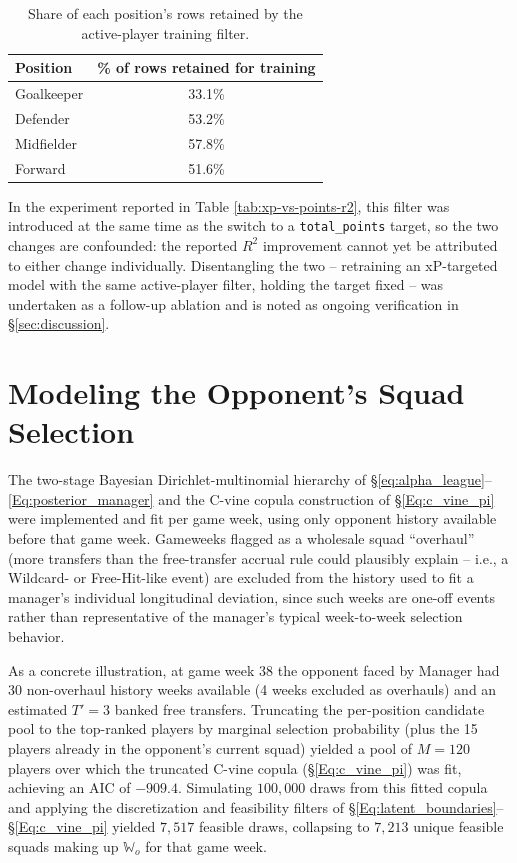 				\begin{table}[H]
					\begin{center}
						\begin{tabular}{|l|c|}
							\hline
							Position & \% of rows retained for training \\
							\hline
							Goalkeeper & 33.1\% \\
							\hline
							Defender & 53.2\% \\
							\hline
							Midfielder & 57.8\% \\
							\hline
							Forward & 51.6\% \\
							\hline
						\end{tabular}
					\end{center}
					\caption{Share of each position's rows retained by the active-player training filter.}
					\label{tab:active-filter}
				\end{table}

				In the experiment reported in Table \ref{tab:xp-vs-points-r2}, this filter was introduced at the same time as the switch to a \texttt{total\_points} target, so the two changes are confounded: the reported $R^2$ improvement cannot yet be attributed to either change individually. Disentangling the two -- retraining an xP-targeted model with the same active-player filter, holding the target fixed -- was undertaken as a follow-up ablation and is noted as ongoing verification in \S\ref{sec:discussion}.

		\section{Modeling the Opponent's Squad Selection} \label{sec:results-opponent}
			The two-stage Bayesian Dirichlet-multinomial hierarchy of \S\ref{eq:alpha_league}--\ref{Eq:posterior_manager} and the C-vine copula construction of \S\ref{Eq:c_vine_pi} were implemented and fit per game week, using only opponent history available before that game week. Gameweeks flagged as a wholesale squad ``overhaul'' (more transfers than the free-transfer accrual rule could plausibly explain -- i.e., a Wildcard- or Free-Hit-like event) are excluded from the history used to fit a manager's individual longitudinal deviation, since such weeks are one-off events rather than representative of the manager's typical week-to-week selection behavior.

			As a concrete illustration, at game week 38 the opponent faced by Manager had 30 non-overhaul history weeks available (4 weeks excluded as overhauls) and an estimated $T' = 3$ banked free transfers. Truncating the per-position candidate pool to the top-ranked players by marginal selection probability (plus the 15 players already in the opponent's current squad) yielded a pool of $M = 120$ players over which the truncated C-vine copula (\S\ref{Eq:c_vine_pi}) was fit, achieving an AIC of $-909.4$. Simulating $100{,}000$ draws from this fitted copula and applying the discretization and feasibility filters of \S\ref{Eq:latent_boundaries}--\S\ref{Eq:c_vine_pi} yielded $7{,}517$ feasible draws, collapsing to $7{,}213$ unique feasible squads making up $\mathbb{W}_o$ for that game week.

